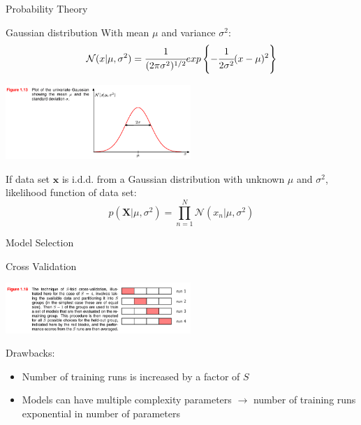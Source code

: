 \documentclass[9pt]{beamer}
\begin{document}
\begin{frame}{Probability Theory}
    \begin{alertblock}{Gaussian distribution}
        With mean $\mu$ and variance $\sigma^2$:
        \[ \mathcal{N}(x|\mu,\sigma^2) = \cfrac{1}{(2\pi \sigma^2)^{1/2}}exp\left\{-\cfrac{1}{2\sigma^2}(x - \mu)^2\right\} \]
        \begin{center}
            \setlength{\fboxsep}{0.5pt} %
            \setlength{\fboxrule}{0.5pt}
            \includegraphics[width=7cm,fbox]{../images/Bishop_MachineLearning_Figure1-13.png} %
        \end{center}
        If data set $\mathbf{x}$ is i.d.d. from a Gaussian distribution with unknown $\mu$ and $\sigma^2$, likelihood function of data set:
        \[ p(\mathbf{X}|\mu, \sigma^2) = \prod_{n=1}^{N}\mathcal{N}(x_n|\mu, \sigma^2) \]
    \end{alertblock}
\end{frame}

\begin{frame}{Model Selection}
    \begin{alertblock}{Cross Validation}
        \begin{center}
            \setlength{\fboxsep}{0.5pt} %
            \setlength{\fboxrule}{0.5pt}
            \includegraphics[width=7cm,fbox]{../images/Bishop_MachineLearning_Figure1-18.png} %
        \end{center}
        Drawbacks:
        \begin{itemize}
            \item Number of training runs is increased by a factor of $S$
            \item Models can have multiple complexity parameters $\rightarrow$ number of training runs exponential in number of parameters
        \end{itemize}
    \end{alertblock}
\end{frame}
\end{document}
